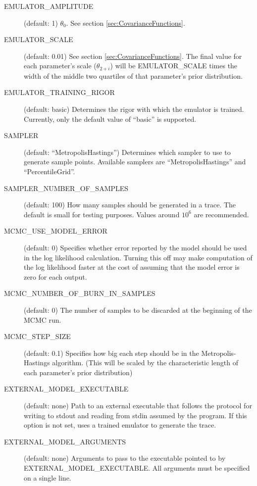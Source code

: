 \begin{description}
    \item[EMULATOR\_AMPLITUDE] (default: 1) $\theta_0$. See section \ref{sec:CovarianceFunctions}.

    \item[EMULATOR\_SCALE] (default: 0.01) See section \ref{sec:CovarianceFunctions}. The final value for each parameter's scale ($\theta_{2+i}$) will be EMULATOR\_SCALE times the width of the middle two quartiles of that parameter's prior distribution.

    \item[EMULATOR\_TRAINING\_RIGOR] (default: basic) Determines the rigor with which the emulator is trained. Currently, only the default value of ``basic'' is supported.

    \item[SAMPLER] (default: ``MetropolisHastings'') Determines which sampler to use to generate sample points. Available samplers are ``MetropolisHastings'' and ``PercentileGrid''.

    \item[SAMPLER\_NUMBER\_OF\_SAMPLES] (default: 100) How many samples should be generated in a trace. The default is small for testing purposes. Values around $10^6$ are recommended.

    \item[MCMC\_USE\_MODEL\_ERROR] (default: 0) Specifies whether error reported by the model should be used in the log likelihood calculation. Turning this off may make computation of the log likelihood faster at the cost of assuming that the model error is zero for each output.

    \item[MCMC\_NUMBER\_OF\_BURN\_IN\_SAMPLES] (default: 0) The number of samples to be discarded at the beginning of the MCMC run.

    \item[MCMC\_STEP\_SIZE] (default: 0.1) Specifies how big each step should be in the Metropolis-Hastings algorithm. (This will be scaled by the characteristic length of each parameter's prior distribution)

    \item[EXTERNAL\_MODEL\_EXECUTABLE] (default: none) Path to an external executable that follows the protocol for writing to stdout and reading from stdin assumed by the  program. If this option is not set,  uses a trained emulator to generate the trace.

    \item[EXTERNAL\_MODEL\_ARGUMENTS] (default: none) Arguments to pass to the executable pointed to by EXTERNAL\_MODEL\_EXECUTABLE. All arguments must be specified on a single line.


\end{description}
